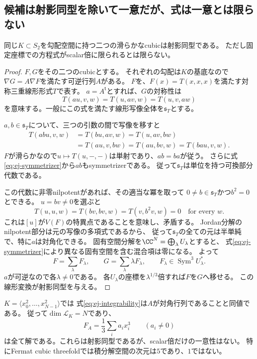 \subsection{候補は射影同型を除いて一意だが、式は一意とは限らない}

\begin{proposition}[滑らかな候補の射影的一意性]
\label{prop:ej-projective-uniqueness}
同じ$K\subset S_2$を勾配空間に持つ二つの滑らかなcubicは射影同型である。
ただし固定座標での方程式がscalar倍に限られるとは限らない。
\end{proposition}
\begin{proof}
$F,G$をその二つのcubicとする。
それぞれの勾配は$K$の基底なので$\nabla G=A\nabla F$を満たす可逆行列$A$がある。
$F$を、$F(x)=T(x,x,x)$を満たす対称三重線形形式$T$で表す。
$a=A^{\mathsf t}$とすれば、$G$の対称性は
\[
 T(au,v,w)=T(u,av,w)=T(u,v,aw)
 \tag{EJ7}\label{eq:ej-symmetrizer}
\]
を意味する。一般にこの式を満たす線形写像全体を$\mathfrak s_T$とする。

$a,b\in\mathfrak s_T$について、三つの引数の間で写像を移すと
\[
 \begin{aligned}
 T(abu,v,w)&=T(bu,av,w)=T(u,av,bw)\\
 &=T(au,v,bw)=T(au,bv,w)=T(bau,v,w).
 \end{aligned}
\]
$F$が滑らかなので$u\mapsto T(u,-,-)$は単射であり、$ab=ba$が従う。
さらに式\eqref{eq:ej-symmetrizer}から$ab$もsymmetrizerである。
従って$\mathfrak s_T$は単位を持つ可換部分代数である。

この代数に非零nilpotentがあれば、その適当な冪を取って
$0\ne b\in\mathfrak s_T$かつ$b^2=0$とできる。
$u=bv\ne0$を選ぶと
\[
 T(u,u,w)=T(bv,bv,w)=T(v,b^2v,w)=0
 \quad\text{for every }w.
\]
これは$[u]$が$V(F)$の特異点であることを意味し、矛盾する。
Jordan分解のnilpotent部分は元の写像の多項式であるから、
従って$\mathfrak s_T$の全ての元は半単純で、特に$a$は対角化できる。
固有空間分解を$\CC^N=\bigoplus_\lambda U_\lambda$とすると、
式\eqref{eq:ej-symmetrizer}により異なる固有空間を含む混合項は零になる。
よって
\[
 F=\sum_\lambda F_\lambda,
 \qquad G=\sum_\lambda\lambda F_\lambda,
 \qquad F_\lambda\in\operatorname{Sym}^3 U_\lambda^*.
\]
$a$が可逆なので各$\lambda\ne0$である。
各$U_\lambda$の座標を$\lambda^{1/3}$倍すれば$F$を$G$へ移せる。
この線形変換が射影同型を与える。
\end{proof}

\begin{example}[Fermatの場合の積分解]
\label{ex:ej-fermat}
$K=\langle x_0^2,\ldots,x_{N-1}^2\rangle$では
式\eqref{eq:ej-integrability}は$A$が対角行列であることと同値である。
従って$\dim\mathcal L_K=N$であり、
\[
 F_A=\frac13\sum_i a_i x_i^3\qquad(a_i\ne0)
\]
は全て解である。これらは射影同型であるが、scalar倍だけの一意性はない。
特にFermat cubic threefoldでは積分解空間の次元は$5$であり、$1$ではない。
\end{example}

